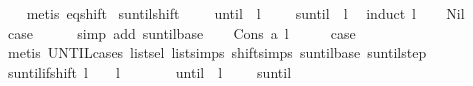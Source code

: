 \begin{isabellebody}
%
\isadelimproof
\ \ %
\endisadelimproof
%
\isatagproof
{}\isamarkupfalse%
\ {\isacharparenleft}metis\ eq{\isacharunderscore}shift{\isacharparenright}%
\endisatagproof
{\isafoldproof}%
%
\isadelimproof
\isanewline
%
\endisadelimproof
\isanewline
{}\isamarkupfalse%
\ suntil{\isacharunderscore}shift{\isacharcolon}\ {\isachardoublequoteopen}{\isasympsi}\ {\isasymomega}\ {\isasymLongrightarrow}\ {\isacharparenleft}{\isasymphi}\ until\ {\isasympsi}{\isacharparenright}\ {\isacharparenleft}l\ {\isacharat}{\isacharminus}\ {\isasymomega}{\isacharparenright}\ {\isasymLongrightarrow}\ {\isacharparenleft}{\isasymphi}\ suntil\ {\isasympsi}{\isacharparenright}\ {\isacharparenleft}l\ {\isacharat}{\isacharminus}\ {\isasymomega}{\isacharparenright}{\isachardoublequoteclose}\isanewline
%
\isadelimproof
%
\endisadelimproof
%
\isatagproof
{}\isamarkupfalse%
{\isacharparenleft}induct\ l{\isacharparenright}\isanewline
\ \ \isamarkupfalse%
\ Nil\isanewline
\ \ \isamarkupfalse%
\ \isamarkupfalse%
\ {\isacharquery}case\isanewline
\ \ \ \ \isamarkupfalse%
\ {\isacharparenleft}simp\ add{\isacharcolon}\ suntil{\isachardot}base{\isacharparenright}\isanewline
{}\isamarkupfalse%
\isanewline
\ \ \isamarkupfalse%
\ {\isacharparenleft}Cons\ a\ l{\isacharparenright}\isanewline
\ \ \isamarkupfalse%
\ \isamarkupfalse%
\ {\isacharquery}case\isanewline
\ \ \ \ \isamarkupfalse%
\ {\isacharparenleft}metis\ UNTIL{\isachardot}cases\ list{\isachardot}sel{\isacharparenleft}{}{\isacharparenright}\ list{\isachardot}simps{\isacharparenleft}{}{\isacharparenright}\ shift{\isacharunderscore}simps{\isacharparenleft}{}{\isacharparenright}\ suntil{\isachardot}base\ suntil{\isachardot}step{\isacharparenright}\isanewline
{}\isamarkupfalse%
%
\endisatagproof
{\isafoldproof}%
%
\isadelimproof
\isanewline
%
\endisadelimproof
\isanewline
{}\isamarkupfalse%
\ suntil{\isacharunderscore}if{\isacharunderscore}shift{\isacharcolon}\ {\isachardoublequoteopen}{\isasymexists}l\ {\isasymomega}{\isachardot}\ {\isasymomega}{\isacharprime}\ {\isacharequal}\ {\isacharparenleft}l\ {\isacharat}{\isacharminus}\ {\isasymomega}{\isacharparenright}\ {\isasymand}\ {\isasympsi}\ {\isasymomega}\ {\isasymand}\ {\isacharparenleft}{\isasymphi}\ until\ {\isasympsi}{\isacharparenright}\ {\isacharparenleft}l\ {\isacharat}{\isacharminus}\ {\isasymomega}{\isacharparenright}\ {\isasymLongrightarrow}\ {\isacharparenleft}{\isasymphi}\ suntil\ {\isasympsi}{\isacharparenright}\ {\isasymomega}{\isacharprime}{\isachardoublequoteclose}\isanewline

\end{isabellebody}
